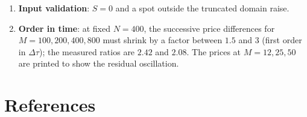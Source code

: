 \documentclass[11pt,a4paper]{article}
\begin{document}
\begin{enumerate}[leftmargin=2em]
\item \textbf{Input validation}: $S = 0$ and a spot outside the
truncated domain raise.

\item \textbf{Order in time}: at fixed $N = 400$, the successive price
differences for $M = 100, 200, 400, 800$ must shrink by a factor
between $1.5$ and $3$ (first order in $\Delta\tau$); the measured
ratios are $2.42$ and $2.08$. The prices at $M = 12, 25, 50$ are
printed to show the residual oscillation.
\end{enumerate}

\section*{References}
\end{document}
